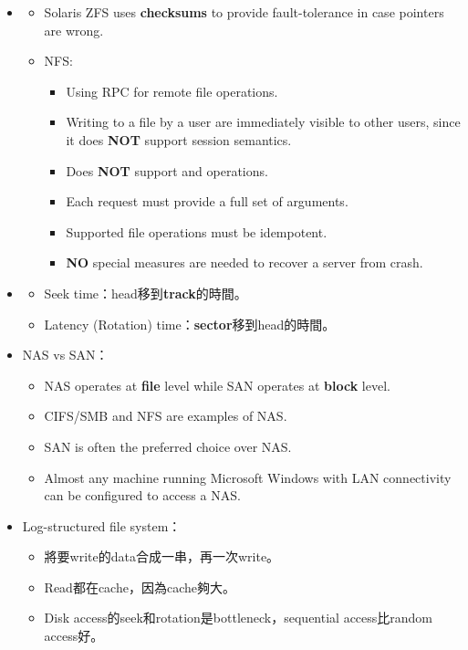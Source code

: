 \begin{itemize}
\begin{itemize}
    \item \quad\quad \begin{itemize}
        \item Solaris ZFS uses \textbf{checksums} to provide fault-tolerance in case pointers are wrong.
        \item NFS: \begin{itemize}
            \item Using RPC for remote file operations.
            \item Writing to a file by a user are immediately visible to other users, since it does \textbf{NOT} support session semantics.
            \item Does \textbf{NOT} support  and  operations.
            \item Each request must provide a full set of arguments.
            \item Supported file operations must be idempotent.
            \item \textbf{NO} special measures are needed to recover a server from crash.
        \end{itemize}
    \end{itemize}
    \item \quad\quad \begin{itemize}
        \item Seek time：head移到\textbf{track}的時間。
        \item Latency (Rotation) time：\textbf{sector}移到head的時間。
    \end{itemize}
    \item NAS vs SAN： \begin{itemize}
        \item NAS operates at \textbf{file} level while SAN operates at \textbf{block} level.
        \item CIFS/SMB and NFS are examples of NAS.
        \item SAN is often the preferred choice over NAS.
        \item Almost any machine running Microsoft Windows with LAN connectivity can be configured to access a NAS.
    \end{itemize}
    \item Log-structured file system： \begin{itemize}
        \item 將要write的data合成一串，再一次write。
        \item Read都在cache，因為cache夠大。
        \item Disk access的seek和rotation是bottleneck，sequential access比random access好。

\end{itemize}
\end{itemize}
\end{itemize}
